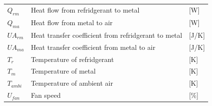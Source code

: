 \begin{center}
	\begin{tabular}{l p{8cm} l}
		$Q_{rm}$				&	Heat flow from refridgerant to metal					& [\si{W}] \\
		$Q_{ma}$				&	Heat flow from metal to air								& [\si{W}] \\
		$U A_{rm}$				& 	Heat transfer coefficient from refridgerant to metal 	& [\si{J}/\si{K}] \\
		$U A_{ma}$				& 	Heat transfer coefficient from metal to air				& [\si{J}/\si{K}] \\
		$T_r$					& 	Temperature of refridgerant 							& [\si{K}] \\
		$T_m$					&	Temperature of metal 									& [\si{K}] \\
		$T_{ambi}$				&	Temperature of ambient air 								& [\si{K}] \\
		$U_{fan}$				&	Fan speed												& [$\%$] \\
	\end{tabular}
\end{center}
%
%
%
%
